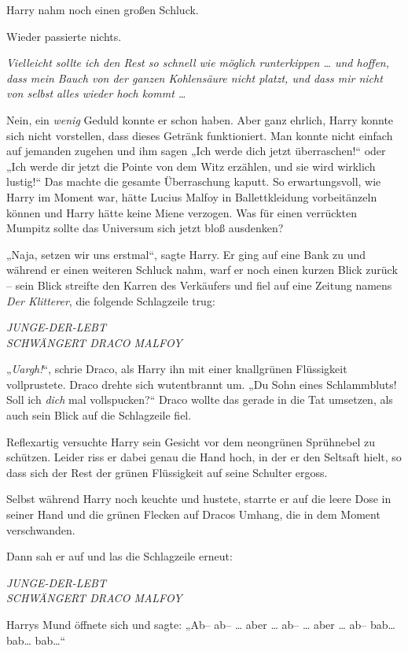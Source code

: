 {Harry nahm noch einen großen Schluck.

Wieder passierte nichts.

\emph{Vielleicht sollte ich den Rest so schnell wie möglich runterkippen … und hoffen, dass mein Bauch von der ganzen Kohlensäure nicht platzt, und dass mir nicht von selbst alles wieder hoch kommt …}

Nein, ein \emph{wenig} Geduld konnte er schon haben. Aber ganz ehrlich, Harry konnte sich nicht vorstellen, dass dieses Getränk funktioniert. Man konnte nicht einfach auf jemanden zugehen und ihm sagen „Ich werde dich jetzt überraschen!“ oder „Ich werde dir jetzt die Pointe von dem Witz erzählen, und sie wird wirklich lustig!“ Das machte die gesamte Überraschung kaputt. So erwartungsvoll, wie Harry im Moment war, hätte Lucius Malfoy in Ballettkleidung vorbeitänzeln können und Harry hätte keine Miene verzogen. Was für einen verrückten Mumpitz sollte das Universum sich jetzt bloß ausdenken?

„Naja, setzen wir uns erstmal“, sagte Harry. Er ging auf eine Bank zu und während er einen weiteren Schluck nahm, warf er noch einen kurzen Blick zurück -- sein Blick streifte den Karren des Verkäufers und fiel auf eine Zeitung namens \emph{Der Klitterer}, die folgende Schlagzeile trug:

\emph{JUNGE-DER-LEBT\\ SCHWÄNGERT DRACO MALFOY}

„\emph{Uargh!}“, schrie Draco, als Harry ihn mit einer knallgrünen Flüssigkeit vollprustete. Draco drehte sich wutentbrannt um. „Du Sohn eines Schlammbluts! Soll ich \emph{dich} mal vollspucken?“ Draco wollte das gerade in die Tat umsetzen, als auch sein Blick auf die Schlagzeile fiel.

Reflexartig versuchte Harry sein Gesicht vor dem neongrünen Sprühnebel zu schützen. Leider riss er dabei genau die Hand hoch, in der er den Seltsaft hielt, so dass sich der Rest der grünen Flüssigkeit auf seine Schulter ergoss.

Selbst während Harry noch keuchte und hustete, starrte er auf die leere Dose in seiner Hand und die grünen Flecken auf Dracos Umhang, die in dem Moment verschwanden.

Dann sah er auf und las die Schlagzeile erneut:

\emph{JUNGE-DER-LEBT\\ SCHWÄNGERT DRACO MALFOY}

Harrys Mund öffnete sich und sagte: „Ab-- ab-- … aber … ab-- … aber … ab-- bab… bab… bab…“

}
